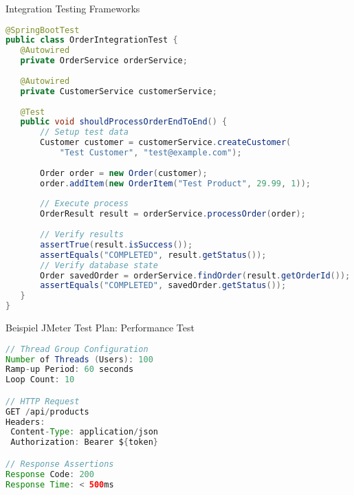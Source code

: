 \begin{example2}{Integration Testing Frameworks}\\
\begin{lstlisting}[language=Java, style=basesmol]
@SpringBootTest
public class OrderIntegrationTest {
   @Autowired
   private OrderService orderService;
   
   @Autowired
   private CustomerService customerService;
   
   @Test
   public void shouldProcessOrderEndToEnd() {
       // Setup test data
       Customer customer = customerService.createCustomer(
           "Test Customer", "test@example.com");
       
       Order order = new Order(customer);
       order.addItem(new OrderItem("Test Product", 29.99, 1));
       
       // Execute process
       OrderResult result = orderService.processOrder(order);
       
       // Verify results
       assertTrue(result.isSuccess());
       assertEquals("COMPLETED", result.getStatus());
       // Verify database state
       Order savedOrder = orderService.findOrder(result.getOrderId());
       assertEquals("COMPLETED", savedOrder.getStatus());
   }
}
\end{lstlisting}
\end{example2}

\begin{example2}{Beispiel JMeter Test Plan:} Performance Test
    
\begin{lstlisting}[language=Java, style=basesmol]
// Thread Group Configuration
Number of Threads (Users): 100
Ramp-up Period: 60 seconds
Loop Count: 10

// HTTP Request
GET /api/products
Headers:
 Content-Type: application/json
 Authorization: Bearer ${token}

// Response Assertions
Response Code: 200
Response Time: < 500ms
\end{lstlisting}
\end{example2}